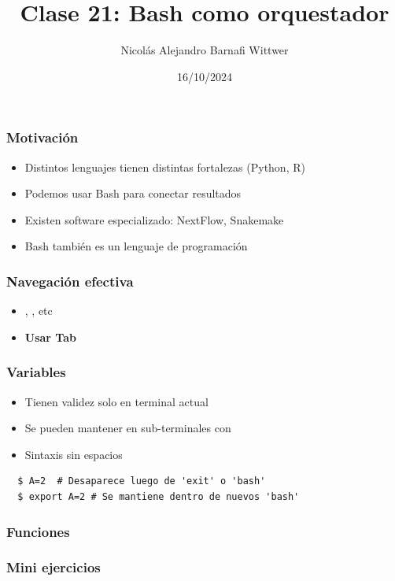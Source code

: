 \documentclass[14pt,aspectratio=169,xcolor=dvipsnames]{beamer}
\title[short title]{Clase 21: Bash como orquestador}
\subtitle{}
\author[NA Barnafi] {Nicolás Alejandro Barnafi Wittwer}
\institute[UC|CMM] 
{
    Pontificia Universidad Católica de Chile \\
    Centro de Modelamiento Matemático
}
\date{16/10/2024}
\begin{document}
\begin{frame}
    \maketitle
\end{frame}
\begin{frame}\frametitle{Motivación}
    \begin{itemize}
        \item Distintos lenguajes tienen distintas fortalezas (Python, R)
        \item Podemos usar Bash para conectar resultados
        \item Existen software especializado: NextFlow, Snakemake
        \item Bash también es un lenguaje de programación
    \end{itemize}
\end{frame}
\begin{frame}\frametitle{Navegación efectiva}
    \begin{itemize}
        \item {}, , etc
        \item \textbf{Usar Tab}
    \end{itemize}

\end{frame}
\begin{frame}[fragile]\frametitle{Variables}
    \begin{itemize}
        \item Tienen validez solo en terminal actual
        \item Se pueden mantener en sub-terminales con 
        \item Sintaxis sin espacios
    \end{itemize}
    
    \begin{verbatim}
  $ A=2  # Desaparece luego de 'exit' o 'bash'
  $ export A=2 # Se mantiene dentro de nuevos 'bash'
    \end{verbatim}
\end{frame}
\begin{frame}\frametitle{Funciones}
\end{frame}
\begin{frame}
    \maketitle
\end{frame}
\begin{frame}[noframenumbering]\frametitle{Mini ejercicios}
\end{frame}
\end{document}
